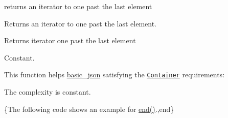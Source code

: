 returns an iterator to one past the last element 

Returns an iterator to one past the last element.

 \begin{DoxyReturn}{Returns}
iterator one past the last element
\end{DoxyReturn}
Constant.

This function helps {\ttfamily \hyperlink{classnlohmann_1_1basic__json}{basic\-\_\-json}} satisfying the \href{http://en.cppreference.com/w/cpp/concept/Container}{\tt Container} requirements\-:
\begin{DoxyItemize}
\item The complexity is constant.
\end{DoxyItemize}

\{The following code shows an example for {\ttfamily \hyperlink{classnlohmann_1_1basic__json_a12ccf14d39ddae52f6c7e126105a230b}{end()}}.,end\}

